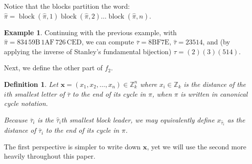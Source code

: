 \documentclass{article}
\numberwithin{theorem}{section}
\newtheorem{definition}[theorem]{Definition}
\theoremstyle{definition}
\newtheorem{example}{Example}
\newcommand\taubar{\overline\tau}
\newcommand{\Z}{\mathbb{Z}}
\newcommand{\block}{\operatorname{block}}
\begin{document}
Notice that the blocks partition the word: $\hat\pi = \block(\hat\pi,1)\block(\hat\pi,2)\dots\block(\hat\pi,n)$.
\begin{example}
    Continuing with the previous example, with $\hat\pi = \mathrm{834\,5 9 B\,1A F\,726\,CED}$, we can compute $\taubar = \mathrm{8BF7E}$, $\hat\tau = 23514$, and (by applying the inverse of Stanley's fundamental bijection) $\tau = (2)(3)(514)$.
\end{example}
Next, we define the other part of $f_2$.

\begin{definition}\label{def:end-of-cycle-index}
    Let $\mathbf{x} = (x_1, x_2, \dots, x_n) \in \mathbb{Z}_k^n$ where $x_{i} \in \Z_k$ is the distance of the $i$th smallest letter of $\overline{\tau}$ to the end of its cycle in $\pi$, when $\pi$ is written in canonical cycle notation.

    Because $\overline{\tau}_i$ is the $\hat\tau_i$th smallest block leader, we may equivalently define $x_{\hat\tau_i}$ as the distance of $\overline{\tau}_i$ to the end of its cycle in $\pi$.
\end{definition}

The first perspective is simpler to write down $\mathbf{x}$, yet we will use the second more heavily throughout this paper.
\end{document}
